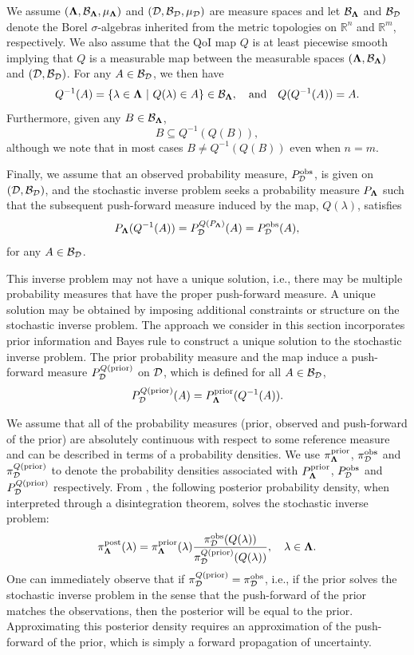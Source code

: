 We assume $(\mathbf{\Lambda}, \mathcal{B}_{\mathbf{\Lambda}}, \mu_{\mathbf{\Lambda}})$ and $(\mathbf{\mathcal{D}}, \mathcal{B}_{\mathbf{\mathcal{D}}}, \mu_{\mathbf{\mathcal{D}}})$ are measure spaces
and let $\mathcal{B}_{\mathbf{\Lambda}}$ and $\mathcal{B}_{\mathbf{\mathcal{D}}}$ denote the Borel $\sigma$-algebras inherited from the metric topologies on $\mathbb{R}^n$ and $\mathbb{R}^m$, respectively.
We also assume that the QoI map $Q$ is at least piecewise smooth implying that $Q$ is a measurable map between the measurable spaces $(\mathbf{\Lambda}, \mathcal{B}_{\mathbf{\Lambda}})$ and $(\mathbf{\mathcal{D}}, \mathcal{B}_{\mathbf{\mathcal{D}}})$.
For any $A\in\mathcal{B}_{\mathbf{\mathcal{D}}}$, we then have
\[Q^{-1}(A) = \left\{ \lambda \in \pspace \ | \ Q(\lambda) \in A \right\}\in\pborel, \quad \text{and} \quad Q(Q^{-1}(A))=A.\]
Furthermore, given any $B\in\mathcal{B}_{\mathbf{\Lambda}}$,
\begin{equation}\label{:eq:mapprops}
B \subseteq Q^{-1}(Q(B)),
\end{equation}
although we note that in most cases $B\neq Q^{-1}(Q(B))$ even when $n=m$.

Finally, we assume that an observed probability measure, $P_{\mathbf{\mathcal{D}}}^{\text{obs}}$, is given on $(\mathbf{\mathcal{D}},\mathcal{B}_{\mathbf{\mathcal{D}}})$, and the stochastic inverse problem seeks a probability measure $P_{\mathbf{\Lambda}}$
such that the subsequent push-forward measure induced by the map, $Q(\lambda)$, satisfies
\begin{equation}\label{:eq:invdefn}
P_{\mathbf{\Lambda}}(Q^{-1}(A)) = P^{Q(P_{\mathbf{\Lambda}})}_{\mathbf{\mathcal{D}}}(A) = P_{\mathbf{\mathcal{D}}}^{\text{obs}}(A),
\end{equation}
for any $A\in \mathcal{B}_{\mathbf{\mathcal{D}}}$.

This inverse problem may not have a unique solution, i.e., there
may be multiple probability measures that have the proper push-forward measure.
A unique solution may be obtained by imposing additional constraints or structure on the stochastic inverse problem.
The approach we consider in this section incorporates prior information and Bayes rule to construct a unique
solution to the stochastic inverse problem.
The prior probability measure and the map
induce a push-forward measure $P_{\mathbf{\mathcal{D}}}^{Q(\text{prior})}$ on $\mathbf{\mathcal{D}}$, which is defined for all $A\in \mathcal{B}_{\mathbf{\mathcal{D}}}$,
\begin{equation}\label{:eq:pfprior}
P_{\mathbf{\mathcal{D}}}^{Q(\text{prior})}(A) = P_{\mathbf{\Lambda}}^{\text{prior}}(Q^{-1}(A)).
\end{equation}

We assume that all of the probability measures (prior, observed and push-forward of the prior) are absolutely continuous with respect to some reference measure
and can be described in terms of a probability densities.
We use $\pi_{\mathbf{\Lambda}}^{\text{prior}}$, $\pi_{\mathbf{\mathcal{D}}}^{\text{obs}}$ and $\pi_{\mathbf{\mathcal{D}}}^{Q(\text{prior})}$ to denote the probability densities associated
with $P_{\mathbf{\Lambda}}^{\text{prior}}$, $P_{\mathbf{\mathcal{D}}}^{\text{obs}}$ and $P_{\mathbf{\mathcal{D}}}^{Q(\text{prior})}$ respectively.
From \cite{Butler2017}, the following posterior probability density, when interpreted through a disintegration theorem, solves the stochastic inverse problem:
\begin{equation}\label{:eq:postpdf}
\pi_{\mathbf{\Lambda}}^{\text{post}}(\lambda) = \pi_{\mathbf{\Lambda}}^{\text{prior}}(\lambda)\frac{\pi_{\mathbf{\mathcal{D}}}^{\text{obs}}(Q(\lambda))}{\pi_{\mathbf{\mathcal{D}}}^{Q(\text{prior})}(Q(\lambda))}, \quad \lambda \in \mathbf{\Lambda}.
\end{equation}
One can immediately observe that if $\pi_{\mathbf{\mathcal{D}}}^{Q(\text{prior})} = \pi_{\mathbf{\mathcal{D}}}^{\text{obs}}$, i.e., if the prior solves the stochastic inverse problem in the sense that the push-forward of the prior matches the observations,
then the posterior will be equal to the prior.
Approximating this posterior density requires an approximation
of the push-forward of the prior, which is simply a forward
propagation of uncertainty.
